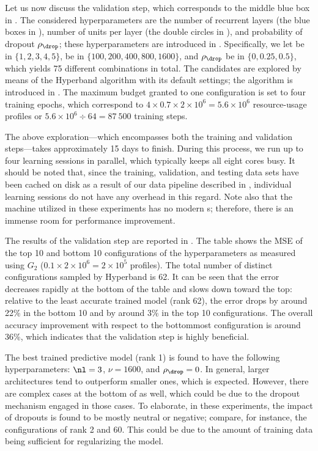 Let us now discuss the validation step, which corresponds to the middle blue box
in . The considered hyperparameters are the number of
recurrent layers \nl (the blue boxes in ), number of units per
layer \nu (the double circles in ), and probability of dropout
$\rho_\drop$; these hyperparameters are introduced in .
Specifically, we let \nl be in $\{ 1, 2, 3, 4, 5 \}$, \nu be in $\{ 100, 200,
400, 800, 1600 \}$, and $\rho_\drop$ be in $\{ 0, 0.25, 0.5 \}$, which yields 75
different combinations in total. The candidates are explored by means of the
Hyperband algorithm with its default settings; the algorithm is introduced in
. The maximum budget granted to one configuration is set to
four training epochs, which correspond to $4 \times 0.7 \times 2 \times 10^6 =
5.6 \times 10^6$ resource-usage profiles or $5.6 \times 10^6 \div 64 = 87~500$
training steps.

The above exploration---which encompasses both the training and validation
steps---takes approximately 15 days to finish. During this process, we run up to
four learning sessions in parallel, which typically keeps all eight cores busy.
It should be noted that, since the training, validation, and testing data sets
have been cached on disk as a result of our data pipeline described in
, individual learning sessions do not have any overhead in this
regard. Note also that the machine utilized in these experiments has no modern
s; therefore, there is an immense room for performance improvement.

The results of the validation step are reported in . The
table shows the \ac{MSE} of the top 10 and bottom 10 configurations of the
hyperparameters as measured using $G_2$ ($0.1 \times 2 \times 10^6 = 2 \times
10^5$ profiles). The total number of distinct configurations sampled by
Hyperband is 62. It can be seen that the error decreases rapidly at the bottom
of the table and slows down toward the top: relative to the least accurate
trained model (rank 62), the error drops by around 22\% in the bottom 10 and by
around 3\% in the top 10 configurations. The overall accuracy improvement with
respect to the bottommost configuration is around 36\%, which indicates that the
validation step is highly beneficial.

The best trained predictive model (rank 1) is found to have the following
hyperparameters: $\nl = 3$, $\nu = 1600$, and $\rho_\drop = 0$. In general,
larger architectures tend to outperform smaller ones, which is expected.
However, there are complex cases at the bottom of  as
well, which could be due to the dropout mechanism engaged in those cases. To
elaborate, in these experiments, the impact of dropouts is found to be mostly
neutral or negative; compare, for instance, the configurations of rank 2 and 60.
This could be due to the amount of training data being sufficient for
regularizing the model.

